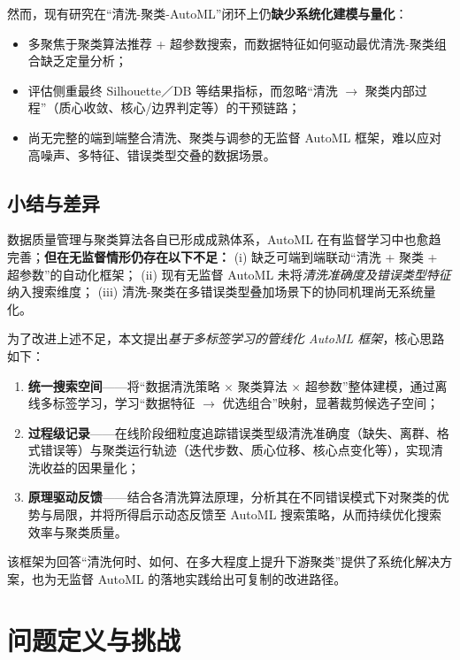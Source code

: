 \documentclass[10pt]{article} %
\numberwithin{equation}{section}
\begin{document}
然而，现有研究在“清洗-聚类-AutoML”闭环上仍\textbf{缺少系统化建模与量化}：
\begin{itemize}[nosep,leftmargin=*]
    \item 多聚焦于聚类算法推荐 + 超参数搜索，而数据特征如何驱动最优清洗-聚类组合缺乏定量分析；  
    \item 评估侧重最终 Silhouette／DB 等结果指标，而忽略“清洗 $\rightarrow$ 聚类内部过程”（质心收敛、核心/边界判定等）的干预链路；  
    \item 尚无完整的端到端整合清洗、聚类与调参的无监督 AutoML 框架，难以应对高噪声、多特征、错误类型交叠的数据场景。  
\end{itemize}

\subsection{小结与差异}
\label{subsec:summary-related}

数据质量管理与聚类算法各自已形成成熟体系，AutoML 在有监督学习中也愈趋完善；\textbf{但在无监督情形仍存在以下不足：}
(i) 缺乏可端到端联动“清洗 + 聚类 + 超参数”的自动化框架；
(ii) 现有无监督 AutoML 未将\emph{清洗准确度及错误类型特征}纳入搜索维度；
(iii) 清洗-聚类在多错误类型叠加场景下的协同机理尚无系统量化。

\medskip
为了改进上述不足，本文提出\emph{基于多标签学习的管线化 AutoML 框架}，核心思路如下：  
\begin{enumerate}[nosep,leftmargin=*]
  \item \textbf{统一搜索空间}——将“数据清洗策略 $\times$ 聚类算法 $\times$ 超参数”整体建模，通过离线多标签学习，学习“数据特征 $\rightarrow$ 优选组合”映射，显著裁剪候选子空间；  
  \item \textbf{过程级记录}——在线阶段细粒度追踪错误类型级清洗准确度（缺失、离群、格式错误等）与聚类运行轨迹（迭代步数、质心位移、核心点变化等），实现清洗收益的因果量化；  
  \item \textbf{原理驱动反馈}——结合各清洗算法原理，分析其在不同错误模式下对聚类的优势与局限，并将所得启示动态反馈至 AutoML 搜索策略，从而持续优化搜索效率与聚类质量。  
\end{enumerate}
该框架为回答“清洗何时、如何、在多大程度上提升下游聚类”提供了系统化解决方案，也为无监督 AutoML 的落地实践给出可复制的改进路径。

\section{问题定义与挑战}
\label{sec:problem-and-model}
\end{document}

